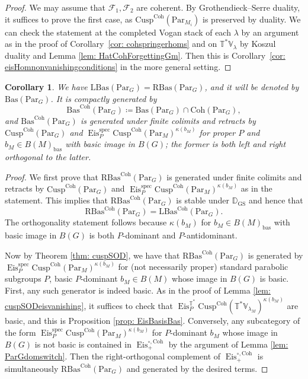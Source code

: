 \documentclass{amsart}
\newtheorem{corollary}[theorem]{Corollary}
\theoremstyle{definition}
\theoremstyle{remark}
\numberwithin{equation}{section}
\newcommand{\mc}{\mathcal}
\newcommand{\bas}{\mathrm{bas}}
\newcommand{\spec}{\mathrm{spec}}
\newcommand{\D}{\mathbb{D}}
\newcommand{\Par}{\mathrm{Par}}
\DeclareMathOperator{\Eis}{\mathrm{Eis}}
\newcommand{\Coh}{\mathrm{Coh}}
\newcommand{\Cusp}{\mathrm{Cusp}}
\newcommand{\GS}{\mathrm{GS}}
\newcommand{\V}{\mathbb{V}}
\newcommand{\T}{\mathbb{T}}
\newcommand{\RBas}{\mathrm{RBas}}
\newcommand{\LBas}{\mathrm{LBas}}
\newcommand{\Bas}{\mathrm{Bas}}
\begin{document}
\begin{proof}
We may assume that $\mc F_1, \mc F_2$ are coherent. By Grothendieck--Serre duality, it suffices to prove the first case, as $\Cusp^\Coh(\Par_{M_i})$ is preserved by duality. 
We can check the statement at the completed Vogan stack of each $\lambda$ by an argument as in the proof of Corollary~\ref{cor: cohspringerhoms} and on $\T^{\ast}\V_{\lambda}$ by Koszul duality and Lemma \ref{lem: HatCohForgettingGm}. Then this is Corollary~\ref{cor: eisHomnonvanishingconditions} in the more general setting. 
\end{proof}

\begin{corollary}{\label{cor: BasParGgenbyCusp}}
We have $\LBas(\Par_G)=\RBas(\Par_G)$, and it will be denoted by $\Bas(\Par_G)$. It is compactly generated by
\[
\Bas^\Coh(\Par_G)\coloneq \Bas(\Par_G)\cap \Coh(\Par_G), 
\]
and $\Bas^\Coh(\Par_G)$ is generated under finite colimits and retracts by $\Cusp^\Coh(\Par_G)$ and $\Eis_P^\spec \Cusp^\Coh(\Par_M)^{\kappa(b_M)}$ for proper $P$ and $b_M \in B(M)_{\bas}$ with basic image in $B(G)$; the former is both left and right orthogonal to the latter. 
\end{corollary}
\begin{proof}
We first prove that $\RBas^{\Coh}(\Par_G)$ is generated under finite colimits and retracts by $\Cusp^\Coh(\Par_G)$ and $\Eis^{\spec}_P \Cusp^\Coh(\Par_M)^{\kappa(b_M)}$ as in the statement. This implies that $\RBas^{\Coh}(\Par_G)$ is stable under $\D_{\GS}$ and hence that 
\begin{equation*}
    \RBas^{\Coh}(\Par_G) = \LBas^{\Coh}(\Par_G).
\end{equation*}
The orthogonality statement follows because $\kappa(b_M)$ for $b_M \in B(M)_{\bas}$ with basic image in $B(G)$ is both $P$-dominant and $P$-antidominant.

Now by Theorem \ref{thm: cuspSOD}, we have that $\RBas^{\Coh}(\Par_G)$ is generated by $\Eis^{\spec}_P \Cusp^{\Coh}(\Par_M)^{\kappa(b_M)}$ for (not necessarily proper) standard parabolic subgroups $P$, basic $P$-dominant $b_M \in B(M)$ whose image in $B(G)$ is basic. First, any such generator is indeed basic. As in the proof of Lemma \ref{lem: cuspSODeisvanishing}, it suffices to check that $\Eis^{\T^{\ast}}_P \Cusp^{\Coh}(\T^{\ast}\V_{\lambda_M})^{\kappa(b_M)}$ are basic, and this is Proposition \ref{prop: EisBasisBas}. Conversely, any subcategory of the form $\Eis^{\spec}_P \Cusp^{\Coh}(\Par_M)^{\kappa(b_M)}$  for $P$-dominant $b_M$ whose image in $B(G)$ is not basic is contained in $\Eis^{\circ, \Coh}_+$ by the argument of Lemma \ref{lem: ParGdomswitch}. Then the right-orthogonal complement of $\Eis^{\circ, \Coh}_+$ is simultaneously $\RBas^{\Coh}(\Par_G)$ and generated by the desired terms. 
\end{proof}
\end{document}
